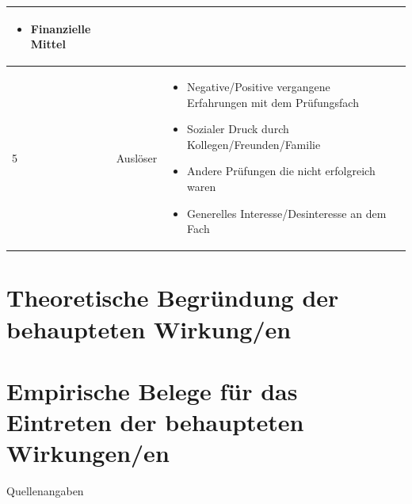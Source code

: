 \documentclass[12pt, a4paper]{article}
\begin{document}
\begin{table}[h!]
\begin{tabularx}{\textwidth}{|p{0.3cm}|p{3.5cm}|X|p{0.3cm}|}
\begin{itemize}[noitemsep, topsep=0pt]
			\item Finanzielle Mittel
		\end{itemize}
		&  \\
		\hline
		5 & Auslöser                               & 
		\begin{itemize}[noitemsep, topsep=0pt]
			\item Negative/Positive vergangene Erfahrungen mit dem Prüfungsfach
			\item Sozialer Druck durch Kollegen/Freunden/Familie
			\item Andere Prüfungen die nicht erfolgreich waren
			\item Generelles Interesse/Desinteresse an dem Fach
		\end{itemize}
		&  \\
		\hline
	\end{tabularx}
\end{table}
\newpage
\section*{Theoretische Begründung der behaupteten Wirkung/en}
	\lipsum[3-6]

\newpage
\section*{Empirische Belege für das Eintreten der behaupteten Wirkungen/en}
	\lipsum[5-8]

\newpage
{}

Quellenangaben
\end{document}
